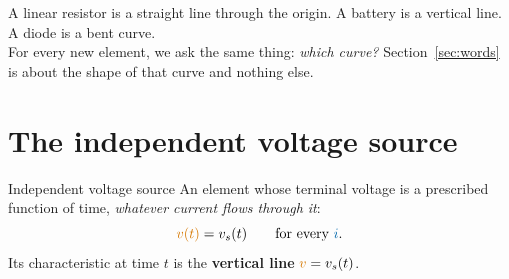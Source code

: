 \documentclass[11pt,a4paper]{article}
\newcommand{\Icol}[1]{\textcolor{ccur}{#1}}
\newcommand{\Vcol}[1]{\textcolor{cvolt}{#1}}
\newcommand{\viaxes}[3]{%
  \draw[vax] (-#1,0) -- (#1,0) node[right=1pt, font=\scriptsize, text=cvolt] {$v$};
  \draw[vax] (0,-#2) -- (0,#2) node[above=1pt, font=\scriptsize, text=ccur] {$i$};
  \node[ttl] at (0,-#2-0.68) {#3};}
\begin{document}
\begin{center}
\end{center}

\begin{ideabox}
A linear resistor is a straight line through the origin. A battery is a vertical line. A
diode is a bent curve.\\[3pt]
For every new element, we ask the same thing: \emph{which curve?} Section~\ref{sec:words}
is about the shape of that curve and nothing else.
\end{ideabox}

\section{The independent voltage source}

\begin{definitionbox}{Independent voltage source}
An element whose terminal voltage is a prescribed function of time, \emph{whatever current
flows through it}:
\[
  \Vcol{v(t)} = v_s(t) \qquad\text{for every } \Icol{i} .
\]
Its characteristic at time $t$ is the \textbf{vertical line} $\Vcol{v} = v_s(t)$.
\end{definitionbox}
\end{document}
